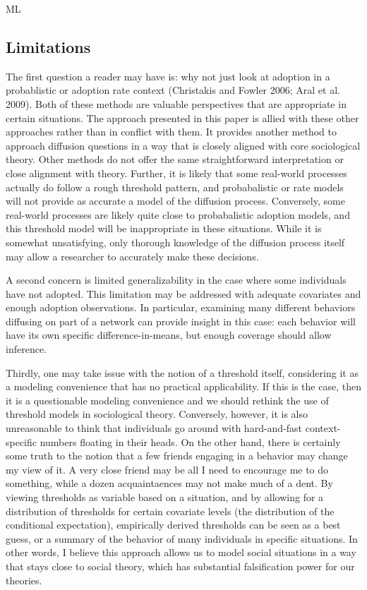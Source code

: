 \documentclass{article}
\begin{document}
ML

\subsection{Limitations}

The first question a reader may have is: why not just look at adoption in a probablistic or adoption rate context (Christakis and Fowler 2006; Aral et al. 2009). Both of these methods are valuable perspectives that are appropriate in certain situations. The approach presented in this paper is allied with these other approaches rather than in conflict with them. It provides another method to approach diffusion questions in a way that is closely aligned with core sociological theory. Other methods do not offer the same straightforward interpretation or close alignment with theory. Further, it is likely that some real-world processes actually do follow a rough threshold pattern, and probabalistic or rate models will not provide as accurate a model of the diffusion process. Conversely, some real-world processes are likely quite close to probabalistic adoption models, and this threshold model will be inappropriate in these situations. While it is somewhat unsatisfying, only thorough knowledge of the diffusion process itself may allow a researcher to accurately make these decisions.

A second concern is limited generalizability in the case where some individuals have not adopted. This limitation may be addressed with adequate covariates and enough adoption observations. In particular, examining many different behaviors diffusing on part of a network can provide insight in this case: each behavior will have its own specific difference-in-means, but enough coverage should allow inference. 

Thirdly, one may take issue with the notion of a threshold itself, considering it as a modeling convenience that has no practical applicability. If this is the case, then it is a questionable modeling convenience and we should rethink the use of threshold models in sociological theory. Conversely, however, it is also unreasonable to think that individuals go around with hard-and-fast context-specific numbers floating in their heads. On the other hand, there is certainly some truth to the notion that a few friends engaging in a behavior may change my view of it. A very close friend may be all I need to encourage me to do something, while a dozen acquaintaences may not make much of a dent. By viewing thresholds as variable based on a situation, and by allowing for a distribution of thresholds for certain covariate levels (the distribution of the conditional expectation), empirically derived thresholds can be seen as a best guess, or a summary of the behavior of many individuals in specific situations. In other words, I believe this approach allows us to model social situations in a way that stays close to social theory, which has substantial falsification power for our theories. 
\end{document}
